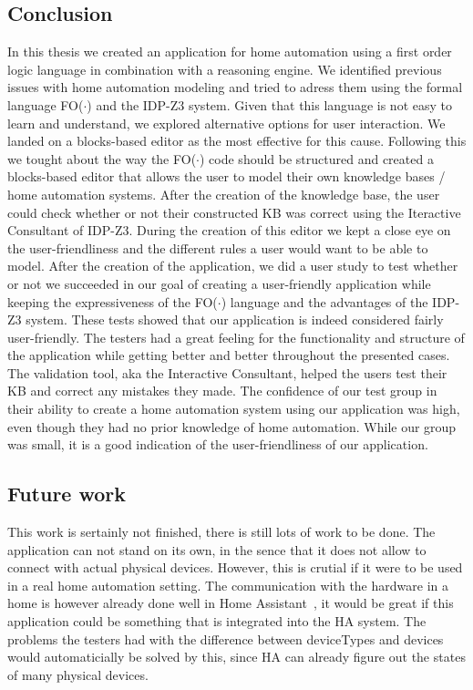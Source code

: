 \documentclass[11pt,a4paper]{report}
\newcommand{\fodot}{FO($\cdot$)\xspace}
\begin{document}
\begin{idplisting}
\chapter{Conclusion}
In this thesis we created an application for home automation using a first order logic language in combination with a reasoning engine. We identified previous issues with home automation modeling and tried to adress them using the formal language \fodot and the IDP-Z3 system. Given that this language is not easy to learn and understand, we explored alternative options for user interaction. We landed on a blocks-based editor as the most effective for this cause. Following this we tought about the way the \fodot code should be structured and created a blocks-based editor that allows the user to model their own knowledge bases / home automation systems. After the creation of the knowledge base, the user could check whether or not their constructed KB was correct using the Iteractive Consultant of IDP-Z3. During the creation of this editor we kept a close eye on the user-friendliness and the different rules a user would want to be able to model. After the creation of the application, we did a user study to test whether or not we succeeded in our goal of creating a user-friendly application while keeping the expressiveness of the \fodot language and the advantages of the IDP-Z3 system. These tests showed that our application is indeed considered fairly user-friendly. The testers had a great feeling for the functionality and structure of the application while getting better and better throughout the presented cases. The validation tool, aka the Interactive Consultant, helped the users test their KB and correct any mistakes they made. The confidence of our test group in their ability to create a home automation system using our application was high, even though they had no prior knowledge of home automation. While our group was small, it is a good indication of the user-friendliness of our application.

\section{Future work}
This work is sertainly not finished, there is still lots of work to be done. The application can not stand on its own, in the sence that it does not allow to connect with actual physical devices. However, this is crutial if it were to be used in a real home automation setting. The communication with the hardware in a home is however already done well in Home Assistant~\cite{HA}, it would be great if this application could be something that is integrated into the HA system. The problems the testers had with the difference between deviceTypes and devices would automaticially be solved by this, since HA can already figure out the states of many physical devices.


\end{idplisting}
\end{document}
